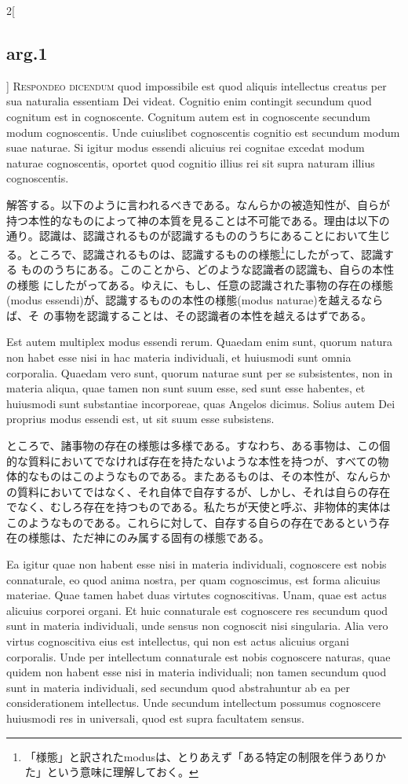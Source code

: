 \documentclass[paper=a4paper,fontsize=10pt,jafontsize=9pt,titlepage]{jlreq}
\begin{document}
\begin{paracol}{2}[\subsection{arg.1}]
{\scshape Respondeo dicendum} quod impossibile est quod aliquis intellectus
creatus per sua naturalia essentiam Dei videat. Cognitio enim
contingit secundum quod cognitum est in cognoscente. Cognitum autem
est in cognoscente secundum modum cognoscentis. Unde cuiuslibet
cognoscentis cognitio est secundum modum suae naturae. Si igitur modus
essendi alicuius rei cognitae excedat modum naturae cognoscentis,
oportet quod cognitio illius rei sit supra naturam illius
cognoscentis.

\switchcolumn

解答する。以下のように言われるべきである。なんらかの被造知性が、自らが
持つ本性的なものによって神の本質を見ることは不可能である。理由は以下の
通り。認識は、認識されるものが認識するもののうちにあることにおいて生じ
る。ところで、認識されるものは、認識するものの様態\footnote{「様態」と訳されたmodusは、とりあえず「ある特定の制限を伴うありかた」という意味に理解しておく。}にしたがって、認識する
もののうちにある。このことから、どのような認識者の認識も、自らの本性の様態
にしたがってある。ゆえに、もし、任意の認識された事物の存在の様態(modus
essendi)が、認識するものの本性の様態(modus naturae)を越えるならば、そ
の事物を認識することは、その認識者の本性を越えるはずである。

\switchcolumn*

Est autem multiplex modus essendi rerum. Quaedam enim sunt, quorum
natura non habet esse nisi in hac materia individuali, et huiusmodi
sunt omnia corporalia. Quaedam vero sunt, quorum naturae sunt per se
subsistentes, non in materia aliqua, quae tamen non sunt suum esse,
sed sunt esse habentes, et huiusmodi sunt substantiae incorporeae,
quas Angelos dicimus. Solius autem Dei proprius modus essendi est, ut
sit suum esse subsistens.

\switchcolumn

ところで、諸事物の存在の様態は多様である。すなわち、ある事物は、この個
的な質料においてでなければ存在を持たないような本性を持つが、すべての物
体的なものはこのようなものである。またあるものは、その本性が、なんらか
の質料においてではなく、それ自体で自存するが、しかし、それは自らの存在
でなく、むしろ存在を持つものである。私たちが天使と呼ぶ、非物体的実体は
このようなものである。これらに対して、自存する自らの存在であるという存
在の様態は、ただ神にのみ属する固有の様態である。

\switchcolumn*

Ea igitur quae non habent esse nisi in materia individuali, cognoscere
est nobis connaturale, eo quod anima nostra, per quam cognoscimus, est
forma alicuius materiae. Quae tamen habet duas virtutes
cognoscitivas. Unam, quae est actus alicuius corporei organi. Et huic
connaturale est cognoscere res secundum quod sunt in materia
individuali, unde sensus non cognoscit nisi singularia. Alia vero
virtus cognoscitiva eius est intellectus, qui non est actus alicuius
organi corporalis. Unde per intellectum connaturale est nobis
cognoscere naturas, quae quidem non habent esse nisi in materia
individuali; non tamen secundum quod sunt in materia individuali, sed
secundum quod abstrahuntur ab ea per considerationem intellectus. Unde
secundum intellectum possumus cognoscere huiusmodi res in universali,
quod est supra facultatem sensus.


\end{paracol}
\end{document}

